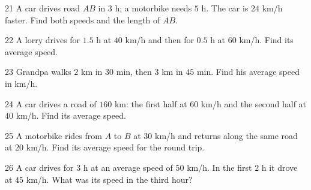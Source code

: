 \gap
\begin{probbox}{21}{\relax}
A car drives road $AB$ in $3$ h; a motorbike needs $5$ h. The car is $24$ km/h faster. Find both speeds and the length of $AB$.
\end{probbox}
\gap
\begin{probbox}{22}{\relax}
A lorry drives for $1.5$ h at $40$ km/h and then for $0.5$ h at $60$ km/h. Find its average speed.
\end{probbox}
\gap
\begin{probbox}{23}{\relax}
Grandpa walks $2$ km in $30$ min, then $3$ km in $45$ min. Find his average speed in km/h.
\end{probbox}
\gap
\begin{probbox}{24}{\relax}
A car drives a road of $160$ km: the first half at $60$ km/h and the second half at $40$ km/h. Find its average speed.
\end{probbox}
\gap
\begin{probbox}{25}{\relax}
A motorbike rides from $A$ to $B$ at $30$ km/h and returns along the same road at $20$ km/h. Find its average speed for the round trip.
\end{probbox}
\gap
\begin{probbox}{26}{\relax}
A car drives for $3$ h at an average speed of $50$ km/h. In the first $2$ h it drove at $45$ km/h. What was its speed in the third hour?
\end{probbox}
